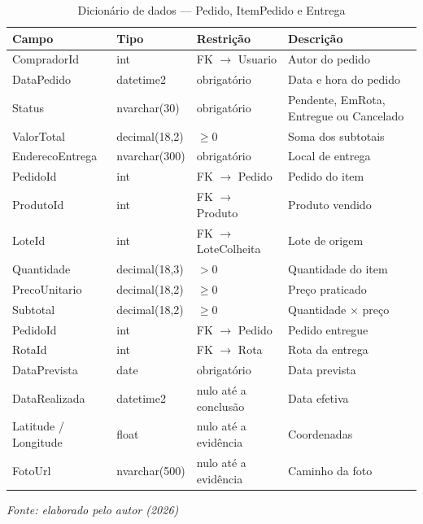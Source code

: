 \begin{table}[H]
  \centering
  \caption{Dicionário de dados --- Pedido, ItemPedido e Entrega}
  \label{tab:dic-pedido}
  \fontsize{9}{10.5}\selectfont
  \begin{tabular}{L{2.6cm}L{2.6cm}L{4.4cm}L{4.6cm}}
    \toprule
    \textbf{Campo} & \textbf{Tipo} & \textbf{Restrição} & \textbf{Descrição} \\
    \midrule
    CompradorId & int & FK $\rightarrow$ Usuario & Autor do pedido \\
    DataPedido & datetime2 & obrigatório & Data e hora do pedido \\
    Status & nvarchar(30) & obrigatório & Pendente, EmRota, Entregue ou Cancelado \\
    ValorTotal & decimal(18,2) & $\geq 0$ & Soma dos subtotais \\
    EnderecoEntrega & nvarchar(300) & obrigatório & Local de entrega \\
    \midrule
    PedidoId & int & FK $\rightarrow$ Pedido & Pedido do item \\
    ProdutoId & int & FK $\rightarrow$ Produto & Produto vendido \\
    LoteId & int & FK $\rightarrow$ LoteColheita & Lote de origem \\
    Quantidade & decimal(18,3) & $> 0$ & Quantidade do item \\
    PrecoUnitario & decimal(18,2) & $\geq 0$ & Preço praticado \\
    Subtotal & decimal(18,2) & $\geq 0$ & Quantidade $\times$ preço \\
    \midrule
    PedidoId & int & FK $\rightarrow$ Pedido & Pedido entregue \\
    RotaId & int & FK $\rightarrow$ Rota & Rota da entrega \\
    DataPrevista & date & obrigatório & Data prevista \\
    DataRealizada & datetime2 & nulo até a conclusão & Data efetiva \\
    Latitude / Longitude & float & nulo até a evidência & Coordenadas \\
    FotoUrl & nvarchar(500) & nulo até a evidência & Caminho da foto \\
    \bottomrule
  \end{tabular}

  \vspace{2pt}
  {\fontsize{9}{10.5}\selectfont\itshape Fonte: elaborado pelo autor (2026)}
\end{table}

